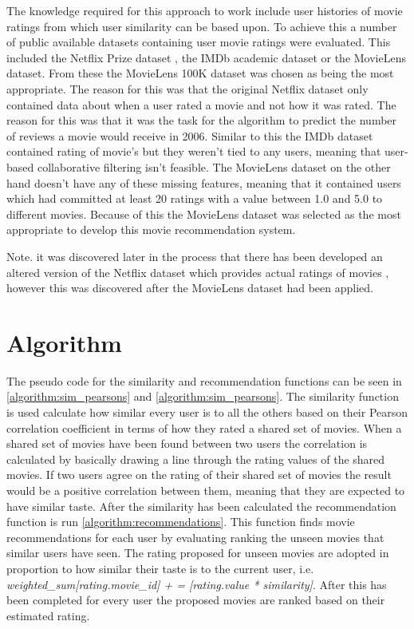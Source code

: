 The knowledge required for this approach to work include user histories of movie ratings from which user similarity can be based upon. To achieve this a number of public available datasets containing user movie ratings were evaluated. This included the Netflix Prize dataset \cite{bennett0netflix} , the IMDb academic dataset \cite{IMDb2017} or the MovieLens \cite{Harper2015} dataset. From these the MovieLens 100K dataset was chosen as being the most appropriate. The reason for this was that the original Netflix dataset only contained data about when a user rated a movie and not how it was rated. The reason for this was that it was the task for the algorithm to predict the number of reviews a movie would receive in 2006.  Similar to this the IMDb dataset contained rating of movie's but they weren't tied to any users, meaning that user-based collaborative filtering isn't feasible. The MovieLens dataset on the other hand doesn't have any of these missing features, meaning that it contained users which had committed at least 20 ratings with a value between 1.0 and 5.0 to different movies. Because of this the MovieLens dataset was selected as the most appropriate to develop this movie recommendation system.

Note. it was discovered later in the process that there has been developed an altered version of the Netflix dataset which provides actual ratings of movies \cite{Netflix2009}, however this was discovered after the MovieLens dataset had been applied.

\section{Algorithm}
	The pseudo code for the similarity and recommendation functions can be seen in \ref{algorithm:sim_pearsons} and \ref{algorithm:sim_pearsons}. The similarity function is used calculate how similar every user is to all the others based on their Pearson correlation coefficient in terms of how they rated a shared set of movies. When a shared set of movies have been found between two users the correlation is calculated by basically drawing a line through the rating values of the shared movies. If two users agree on the rating of their shared set of movies the result would be a positive correlation between them, meaning that they are expected to have similar taste. After the similarity has been calculated the recommendation function is run \ref{algorithm:recommendations}. This function finds movie recommendations for each user by evaluating ranking the unseen movies that similar users have seen. The rating proposed for unseen movies are adopted in proportion to how similar their taste is to the current user, i.e. \textit{weighted\_sum[rating.movie\_id] + = [rating.value * similarity]}. After this has been completed for every user the proposed movies are ranked based on their estimated rating.
	
